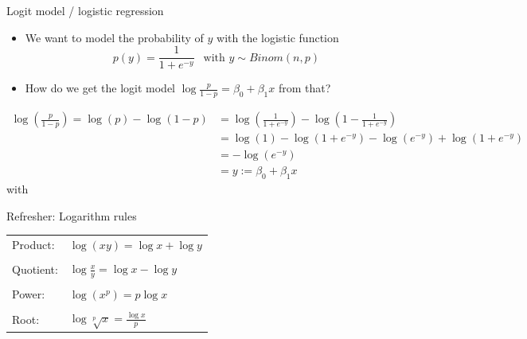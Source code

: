 \documentclass[aspectratio=169]{beamer}
\begin{document}
\begin{frame}{Logit model / logistic regression}
  \begin{itemize}
    \item We want to model the probability of $y$ with the logistic
      function
  \begin{equation*}
    p(y) = \frac{1}{1 + e^{-y}}~~\text{  with } y \sim Binom(n, p)
  \end{equation*}
    \item How do we get the logit model $\log\frac{p}{1 - p} =
      \beta_0 + \beta_1 x$ from that?
  \end{itemize}
      \begin{align*}
        \log\left(\frac{p}{1 - p}\right) = \log(p) - \log(1-p) 
        & = \log\left(\frac{1}{1 + e^{-y}}\right) - \log\left(1 - \frac{1}{1 + e^{-y}}\right) \\
        & = \log(1) - \log(1 + e^{-y}) - \log(e^{-y}) + \log(1 + e^{-y}) \\
        & = -\log(e^{-y})\\
        & = y := \beta_0 + \beta_1 x
      \end{align*}
     with 
\end{frame}

\begin{frame}{Refresher: Logarithm rules}

\begin{tabular}{p{2cm}l}
  Product:  & $\log(xy)=\log x+\log y$ \\
  &\\
  Quotient: & $\log\!{\frac {x}{y}}=\log x-\log y$ \\
  &\\
  Power:    & $\log\left(x^{p}\right)=p\log x$ \\
  &\\
  Root:     & $\log{\sqrt[{p}]{x}}={\frac {\log x}{p}}$ \\
\end{tabular}

\end{frame}
\end{document}
